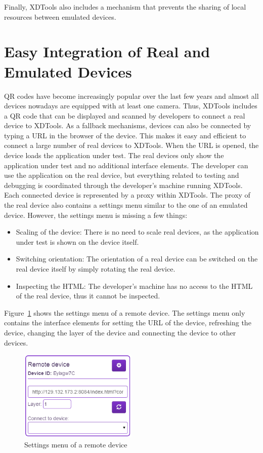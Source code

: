 Finally, XDTools also includes a mechanism that prevents the sharing of local resources between emulated devices.
 
\section{Easy Integration of Real and Emulated Devices}

QR codes have become increasingly popular over the last few years and almost all devices nowadays are equipped with at least one camera. Thus, XDTools includes a QR code that can be displayed and scanned by developers to connect a real device to XDTools. As a fallback mechanisms, devices can also be connected by typing a URL in the browser of the device. This makes it easy and efficient to connect a large number of real devices to XDTools. When the URL is opened, the device loads the application under test. The real devices only show the application under test and no additional interface elements. The developer can use the application on the real device, but everything related to testing and debugging is coordinated through the developer's machine running XDTools. Each connected device is represented by a proxy within XDTools. The proxy of the real device also contains a settings menu similar to the one of an emulated device. However, the settings menu is missing a few things:
\begin{itemize}
	\item Scaling of the device: There is no need to scale real devices, as the application under test is shown on the device itself.
	\item Switching orientation: The orientation of a real device can be switched on the real device itself by simply rotating the real device.
	\item Inspecting the HTML: The developer's machine has no access to the HTML of the real device, thus it cannot be inspected.
\end{itemize}
Figure~\ref{fig:settings_menu_remote} shows the settings menu of a remote device. The settings menu only contains the interface elements for setting the URL of the device, refreshing the device, changing the layer of the device and connecting the device to other devices.

\begin{figure}[H]
  \centering
    \includegraphics[width=0.5\textwidth]{images/screenshots/remote_device.png}
	\caption[Screenshot: Settings menu remote device]{Settings menu of a remote device}
	\label{fig:settings_menu_remote}
\end{figure}

